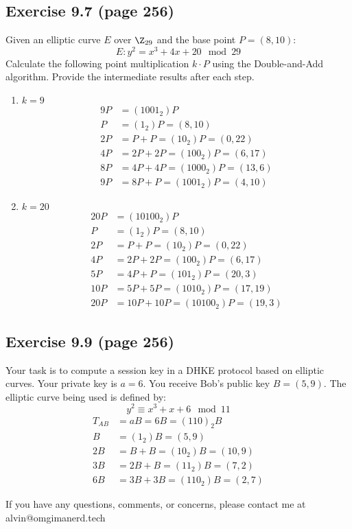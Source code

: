 \documentclass{math}
\begin{document}
\subsection*{Exercise 9.7 (page 256)}
Given an elliptic curve \( E \) over \( \Z_{29} \) and the base point
\( P = (8,10) \):
\[ E: y^2 = x^3+4x+20\mod29 \]
Calculate the following point multiplication \( k\cdot P \) using the
Double-and-Add algorithm. Provide the intermediate results after each step.
\begin{enumerate}
  \item \( k = 9 \)
  \begin{align*}
    9P &= (1001_2)P \\
    P &= (1_2)P = (8,10) \\
    2P &= P+P = (10_2)P = (0,22) \\
    4P &= 2P+2P = (100_2)P = (6,17) \\
    8P &= 4P+4P = (1000_2)P = (13,6) \\
    9P &= 8P+P = (1001_2)P = (4,10)
  \end{align*}
  \item \( k = 20 \)
  \begin{align*}
    20P &= (10100_2)P \\
    P &= (1_2)P = (8,10) \\
    2P &= P+P = (10_2)P = (0,22) \\
    4P &= 2P+2P = (100_2)P = (6,17) \\
    5P &= 4P+P = (101_2)P = (20,3) \\
    10P &= 5P+5P = (1010_2)P = (17,19) \\
    20P &= 10P+10P = (10100_2)P = (19,3)
  \end{align*}
\end{enumerate}

\subsection*{Exercise 9.9 (page 256)}
Your task is to compute a session key in a DHKE protocol based on elliptic
curves. Your private key is \( a = 6 \). You receive Bob's public key
\( B = (5,9) \). The elliptic curve being used is defined by:
\[ y^2 \equiv x^3+x+6\mod11 \]
\begin{align*}
  T_{AB} &= aB = 6B = (110)_2B \\
  B &= (1_2)B = (5,9) \\
  2B &= B+B = (10_2)B = (10,9) \\
  3B &= 2B+B = (11_2)B = (7,2) \\
  6B &= 3B+3B = (110_2)B = (2,7)
\end{align*}

\begin{center}
  If you have any questions, comments, or concerns, please contact me at
  alvin@omgimanerd.tech
\end{center}
\end{document}
